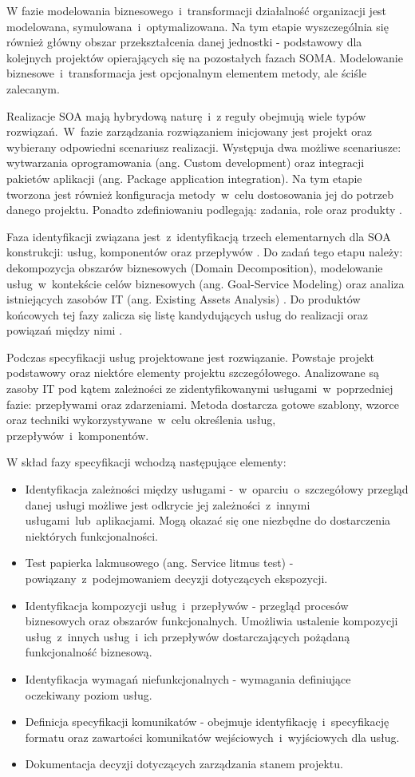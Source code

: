 W fazie modelowania biznesowego~i~transformacji działalność organizacji jest modelowana, symulowana~i~optymalizowana. Na tym etapie wyszczególnia się również główny obszar przekształcenia danej jednostki - podstawowy dla kolejnych projektów opierających się na pozostałych fazach SOMA. Modelowanie biznesowe~i~transformacja jest opcjonalnym elementem metody, ale ściśle zalecanym. 

Realizacje SOA mają hybrydową naturę~i~z reguły obejmują wiele typów rozwiązań.~W~fazie zarządzania rozwiązaniem inicjowany jest projekt oraz wybierany odpowiedni scenariusz realizacji. Występuja dwa możliwe scenariusze: wytwarzania oprogramowania (ang. Custom development) oraz integracji pakietów aplikacji (ang. Package application integration). Na tym etapie tworzona jest również konfiguracja metody~w~celu dostosowania jej do potrzeb danego projektu. Ponadto zdefiniowaniu podlegają: zadania, role oraz produkty \cite{SOMAArsIBMJour}.

Faza identyfikacji związana jest~z~identyfikacją trzech elementarnych dla SOA konstrukcji: usług, komponentów oraz przepływów \cite{PlatIntGor}. Do zadań tego etapu należy: dekompozycja obszarów biznesowych (Domain Decomposition), modelowanie usług~w~kontekście celów biznesowych (ang. Goal-Service Modeling) oraz analiza istniejących zasobów IT (ang. Existing Assets Analysis) \cite{SOMAibmRosSuda}. Do produktów końcowych tej fazy zalicza się listę kandydujących usług do realizacji oraz powiązań między nimi \cite{PlatIntGor}.

Podczas specyfikacji usług projektowane jest rozwiązanie. Powstaje projekt podstawowy oraz niektóre elementy projektu szczegółowego. Analizowane są zasoby IT pod kątem zależności ze zidentyfikowanymi usługami~w~poprzedniej fazie: przepływami oraz zdarzeniami. Metoda dostarcza gotowe szablony, wzorce oraz techniki wykorzystywane~w~celu określenia usług, przepływów~i~komponentów. 

W skład fazy specyfikacji wchodzą następujące elementy:
\begin{itemize}
\item{Identyfikacja zależności między usługami -~w~oparciu~o~szczegółowy przegląd danej usługi możliwe jest odkrycie jej zależności~z~innymi usługami~lub~aplikacjami. Mogą okazać się one niezbędne do dostarczenia niektórych funkcjonalności.}
\item{Test papierka lakmusowego (ang. Service litmus test) - powiązany~z~podejmowaniem decyzji dotyczących ekspozycji.}
\item{Identyfikacja kompozycji usług~i~przepływów - przegląd procesów biznesowych oraz obszarów funkcjonalnych. Umożliwia ustalenie kompozycji usług~z~innych usług~i~ich przepływów dostarczających pożądaną funkcjonalność biznesową.}
\item{Identyfikacja wymagań niefunkcjonalnych - wymagania definiujące oczekiwany poziom usług.}
\item{Definicja specyfikacji komunikatów - obejmuje identyfikację~i~specyfikację formatu oraz zawartości komunikatów wejściowych~i~wyjściowych dla usług.}
\item{Dokumentacja decyzji dotyczących zarządzania stanem projektu.}
\end{itemize}

